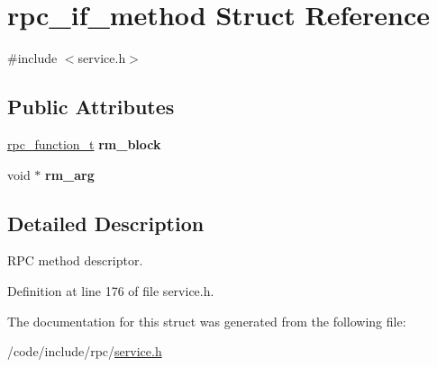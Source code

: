\hypertarget{structrpc__if__method}{}\section{rpc\+\_\+if\+\_\+method Struct Reference}
\label{structrpc__if__method}


{\ttfamily \#include $<$service.\+h$>$}

\subsection*{Public Attributes}
\begin{DoxyCompactItemize}
\item 
\hyperlink{service_8h_a02d3dbd723de9bd5140887c9935ff05a}{rpc\+\_\+function\+\_\+t} {\bfseries rm\+\_\+block}\hypertarget{structrpc__if__method_ad02bcfe0adc134947ab369c927e307a0}{}\label{structrpc__if__method_ad02bcfe0adc134947ab369c927e307a0}

\item 
void $\ast$ {\bfseries rm\+\_\+arg}\hypertarget{structrpc__if__method_a30f477ae1a1636164e2cc5051deb4fa1}{}\label{structrpc__if__method_a30f477ae1a1636164e2cc5051deb4fa1}

\end{DoxyCompactItemize}


\subsection{Detailed Description}
R\+PC method descriptor. 

Definition at line 176 of file service.\+h.



The documentation for this struct was generated from the following file\+:\begin{DoxyCompactItemize}
\item 
/code/include/rpc/\hyperlink{service_8h}{service.\+h}\end{DoxyCompactItemize}
